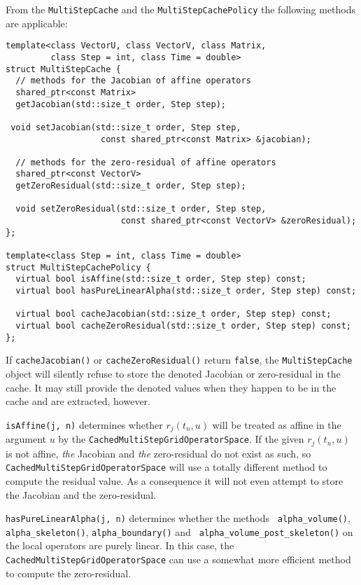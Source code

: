 \documentclass[11pt,a4paper,DIV11,%
notitlepage,oneside,abstracton,%
bibtotoc]{scrartcl}
\begin{document}
From the {\tt MultiStepCache} and the {\tt MultiStepCachePolicy} the following
methods are applicable:
\begin{lstlisting}
template<class VectorU, class VectorV, class Matrix,
         class Step = int, class Time = double>
struct MultiStepCache {
  // methods for the Jacobian of affine operators
  shared_ptr<const Matrix>
  getJacobian(std::size_t order, Step step);
 
 void setJacobian(std::size_t order, Step step,
                   const shared_ptr<const Matrix> &jacobian);

  // methods for the zero-residual of affine operators
  shared_ptr<const VectorV>
  getZeroResidual(std::size_t order, Step step);

  void setZeroResidual(std::size_t order, Step step,
                       const shared_ptr<const VectorV> &zeroResidual);
};

template<class Step = int, class Time = double>
struct MultiStepCachePolicy {
  virtual bool isAffine(std::size_t order, Step step) const;
  virtual bool hasPureLinearAlpha(std::size_t order, Step step) const;

  virtual bool cacheJacobian(std::size_t order, Step step) const;
  virtual bool cacheZeroResidual(std::size_t order, Step step) const;
};
\end{lstlisting}
If {\tt cacheJacobian()} or {\tt cacheZeroResidual()} return {\tt false}, the
{\tt MultiStepCache} object will silently refuse to store the denoted Jacobian
or zero-residual in the cache.  It may still provide the denoted values when
they happen to be in the cache and are extracted, however.

{\tt isAffine(j, n)} determines whether $r_j(t_n,u)$ will be treated as affine
in the argument $u$ by the {\tt CachedMultiStepGridOperatorSpace}.  If the
given $r_j(t_n,u)$ is not affine, {\em the} Jacobian and {\em the}
zero-residual do not exist as such, so {\tt CachedMultiStepGridOperatorSpace}
will use a totally different method to compute the residual value.  As a
consequence it will not even attempt to store the Jacobian and the
zero-residual.

{\tt hasPureLinearAlpha(j, n)} determines whether the methods {\tt
  alpha\_volume()}, {\tt alpha\_skeleton()}, {\tt alpha\_boundary()} and {\tt
  alpha\_volume\_post\_skeleton()} on the local operators are purely linear.
In this case, the {\tt CachedMultiStepGridOperatorSpace} can use a somewhat
more efficient method to compute the zero-residual.
\end{document}

